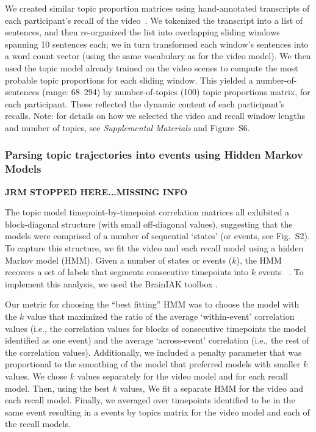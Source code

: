\documentclass{article}
\newcommand{\corrmats}{S2}
\newcommand{\topicopt}{S6}
\begin{document}
We created similar topic proportion matrices using hand-annotated transcripts of each participant's recall of the video~\citep[annotated by ][]{ChenEtal17}.  We tokenized the transcript into a list of sentences, and then re-organized the list into overlapping sliding windows spanning 10 sentences each; we in turn transformed each window's sentences into a word count vector (using the same vocabulary as for the video model).  We then used the topic model already trained on the video scenes to compute the most probable topic proportions for each sliding window.  This yielded a number-of-sentences (range: 68--294) by number-of-topics (100) topic proportions matrix, for each participant.  These reflected the dynamic content of each participant's recalls.  Note: for details on how we selected the video and recall window lengths and number of topics, see \textit{Supplemental Materials} and Figure~\topicopt.

\subsubsection*{Parsing topic trajectories into events using Hidden Markov Models}

\textbf{JRM STOPPED HERE...MISSING INFO}

The topic model timepoint-by-timepoint correlation matrices all exhibited a block-diagonal structure (with small off-diagonal values), suggesting that the models were comprised of a number of sequential `states' (or events, see Fig.~\corrmats). To capture this structure, we fit the video and each recall model using a hidden Markov model (HMM). Given a number of states or events ($k$), the HMM recovers a set of labels that segments consecutive timepoints into $k$ events ~\citep{Rabi89, BaldEtal17}. To implement this analysis, we used the BrainIAK toolbox \citep{BaldEtal17, Brainiak}.

Our metric for choosing the ``best fitting'' HMM was to choose the model with the $k$ value that maximized the ratio of the average `within-event' correlation values (i.e., the correlation values for blocks of consecutive timepoints the model identified as one event) and the average `across-event' correlation (i.e., the rest of the correlation values). Additionally, we included a penalty parameter that was proportional to the smoothing of the model that preferred models with smaller $k$ values. We chose $k$ values separately for the video model and for each recall model.  Then, using the best $k$ values, We fit a separate HMM for the video and each recall model. Finally, we averaged over timepoints identified to be in the same event resulting in a events by topics matrix for the video model and each of the recall models.
\end{document}
